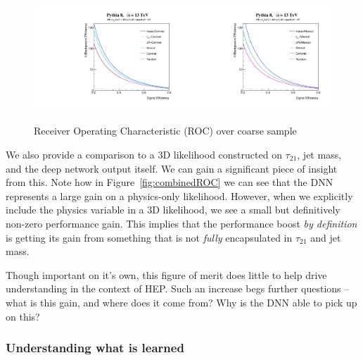 \begin{figure}[!htbp]
  \centering
  \includegraphics[width=0.5\textwidth]{figures/ROC_3}\includegraphics[width=0.5\textwidth]{figures/ROC_4}
  \caption{Receiver Operating Characteristic (ROC) over coarse sample}
  \label{fig:combinedROC2}
\end{figure}

We also provide a comparison to a 3D likelihood constructed on $\tau_{21}$, jet mass, and the deep network output itself. We can gain a significant piece of insight from this. Note how in Figure~\ref{fig:combinedROC} we can see that the DNN represents a large gain on a physics-only likelihood. However, when we explicitly include the physics variable in a 3D likelihood, we see a small but definitively non-zero performance gain. This implies that the performance boost \emph{by definition} is getting its gain from something that is not \emph{fully} encapsulated in $\tau_{21}$ and jet mass. 

Though important on it's own, this figure of merit does little to help drive understanding in the context of HEP. Such an increase begs further questions -- what is this gain, and where does it come from? Why is the DNN able to pick up on this?



\subsubsection{Understanding what is learned} %
\label{ssub:understanding_what_is_learned}

